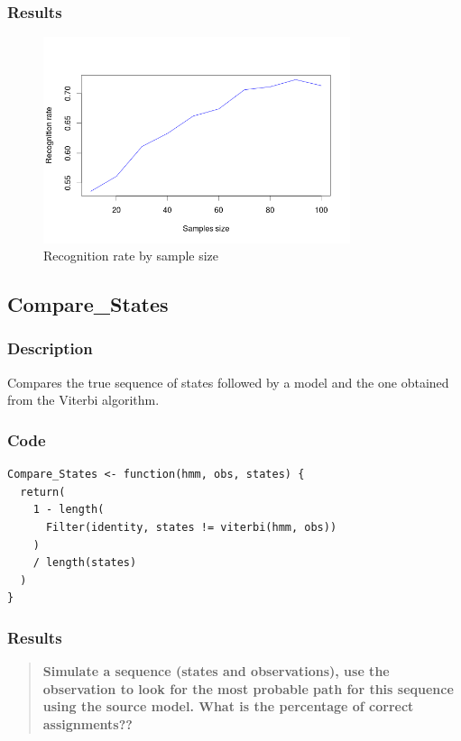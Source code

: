 \documentclass[a4paper]{article}
\begin{document}
\subsubsection{Results}

\begin{figure}[ht!]
\centering
\includegraphics[width=90mm]{recograph.png}
\caption{Recognition rate by sample size}
\label{overflow}
\end{figure}

\subsection{Compare\_States}

\subsubsection{Description}
Compares the true sequence of states followed by a model and the one obtained from the Viterbi algorithm.

\subsubsection{Code}

\begin{lstlisting}
Compare_States <- function(hmm, obs, states) {
  return(
    1 - length(
      Filter(identity, states != viterbi(hmm, obs))
    )
    / length(states)
  )
}
\end{lstlisting}

\subsubsection{Results}

\begin{quotation}
\textbf{Simulate a sequence (states and observations), use the observation to look for the most
probable path for this sequence using the source model. What is the percentage of correct assignments??}
\end{quotation}
\end{document}
